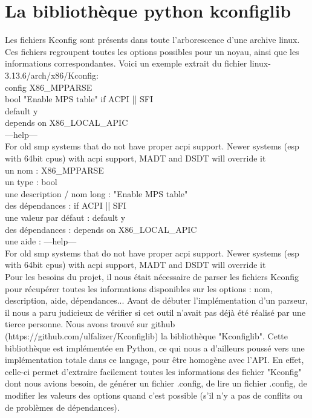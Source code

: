 \documentclass[16pts]{report}
\begin{document}
    \section{La bibliothèque python kconfiglib}
    \label{sec:La bibliothèque python kconfiglib}
    
    Les fichiers Kconfig sont présents dans toute l'arborescence d'une archive linux.
    Ces fichiers regroupent toutes les options possibles pour un noyau, ainsi que 
    les informations correspondantes. 
    Voici un exemple extrait du fichier linux-3.13.6/arch/x86/Kconfig: \\

    config X86\_MPPARSE\\
        bool "Enable MPS table" if ACPI || SFI\\
        default y\\
        depends on X86\_LOCAL\_APIC\\
        ---help---\\
          For old smp systems that do not have proper acpi support. Newer systems
          (esp with 64bit cpus) with acpi support, MADT and DSDT will override it\\

    un nom : X86\_MPPARSE\\
    un type : bool\\
    une description / nom long : "Enable MPS table"\\
    des dépendances : if ACPI || SFI\\
    une valeur par défaut : default y\\
    des dépendances : depends on X86\_LOCAL\_APIC\\
    une aide : ---help---\\
        For old smp systems that do not have proper acpi support. Newer systems
        (esp with 64bit cpus) with acpi support, MADT and DSDT will override it\\

    Pour les besoins du projet, il nous était nécessaire de parser les fichiers 
    Kconfig pour récupérer toutes les informations disponibles sur les options : nom,
    description, aide, dépendances... Avant de débuter l'implémentation d'un 
    parseur, il nous a paru judicieux de vérifier si cet 
    outil n'avait pas déjà été réalisé par une tierce personne.
    Nous avons trouvé sur github (https://github.com/ulfalizer/Kconfiglib) la 
    bibliothèque "Kconfiglib". Cette bibliothèque est implémentée en Python, ce qui 
    nous a d'ailleurs poussé vers une implémentation totale dans ce langage, pour 
    être homogène avec l'API. En effet, celle-ci permet d'extraire facilement toutes 
    les informations des fichier "Kconfig" dont nous avions besoin, de générer un 
    fichier .config, de lire un fichier .config, de modifier les valeurs des options
    quand c'est possible (s'il n'y a pas de conflits ou de problèmes de dépendances).\\
\end{document}

